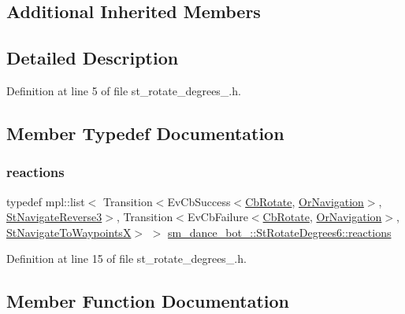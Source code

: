 \subsection*{Additional Inherited Members}


\subsection{Detailed Description}


Definition at line 5 of file st\+\_\+rotate\+\_\+degrees\+\_.\+h.



\subsection{Member Typedef Documentation}
\mbox{\label{structsm__dance__bot__2_1_1StRotateDegrees6_a3a362ea394fefbe776d10f4709843431}} 
\subsubsection{\texorpdfstring{reactions}{reactions}}
{\footnotesize\ttfamily typedef mpl\+::list$<$ Transition$<$Ev\+Cb\+Success$<$\hyperlink{classcl__move__base__z_1_1CbRotate}{Cb\+Rotate}, \hyperlink{classsm__dance__bot__2_1_1OrNavigation}{Or\+Navigation}$>$, \hyperlink{structsm__dance__bot__2_1_1StNavigateReverse3}{St\+Navigate\+Reverse3}$>$, Transition$<$Ev\+Cb\+Failure$<$\hyperlink{classcl__move__base__z_1_1CbRotate}{Cb\+Rotate}, \hyperlink{classsm__dance__bot__2_1_1OrNavigation}{Or\+Navigation}$>$, \hyperlink{structsm__dance__bot__2_1_1StNavigateToWaypointsX}{St\+Navigate\+To\+WaypointsX}$>$ $>$ \hyperlink{structsm__dance__bot__2_1_1StRotateDegrees6_a3a362ea394fefbe776d10f4709843431}{sm\+\_\+dance\+\_\+bot\+\_\+::\+St\+Rotate\+Degrees6\+::reactions}}



Definition at line 15 of file st\+\_\+rotate\+\_\+degrees\+\_.\+h.



\subsection{Member Function Documentation}
\mbox{\label{structsm__dance__bot__2_1_1StRotateDegrees6_a61592eedf7748d25bbb80b8cbd2851be}} 
